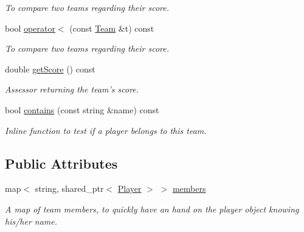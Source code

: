 \begin{DoxyCompactItemize}
\begin{DoxyCompactList}\small\item\em \-To compare two teams regarding their score. \end{DoxyCompactList}\item 
\hypertarget{classTeam_a1811d6b7e660181d8209b455cb9d92e0}{bool \hyperlink{classTeam_a1811d6b7e660181d8209b455cb9d92e0}{operator$<$} (const \hyperlink{classTeam}{\-Team} \&t) const }\label{classTeam_a1811d6b7e660181d8209b455cb9d92e0}

\begin{DoxyCompactList}\small\item\em \-To compare two teams regarding their score. \end{DoxyCompactList}\item 
\hypertarget{classTeam_a57a775ba38aaf35510e412a01d6a3062}{double \hyperlink{classTeam_a57a775ba38aaf35510e412a01d6a3062}{get\-Score} () const }\label{classTeam_a57a775ba38aaf35510e412a01d6a3062}

\begin{DoxyCompactList}\small\item\em \-Assessor returning the team's score. \end{DoxyCompactList}\item 
bool \hyperlink{classTeam_ae3bc7f55a2204019bf393ccd110ce873}{contains} (const string \&name) const 
\begin{DoxyCompactList}\small\item\em \-Inline function to test if a player belongs to this team. \end{DoxyCompactList}\end{DoxyCompactItemize}
\subsection*{\-Public \-Attributes}
\begin{DoxyCompactItemize}
\item 
\hypertarget{classTeam_a5e2f0bd7b2f9885e7d99c0b1c612b5fa}{map$<$ string, shared\-\_\-ptr$<$ \hyperlink{classPlayer}{\-Player} $>$ $>$ \hyperlink{classTeam_a5e2f0bd7b2f9885e7d99c0b1c612b5fa}{members}}\label{classTeam_a5e2f0bd7b2f9885e7d99c0b1c612b5fa}

\begin{DoxyCompactList}\small\item\em \-A map of team members, to quickly have an hand on the player object knowing his/her name. \end{DoxyCompactList}\end{DoxyCompactItemize}
